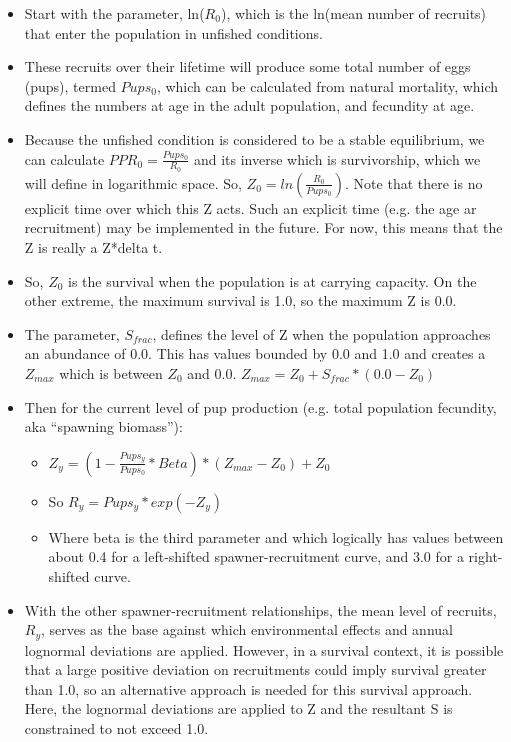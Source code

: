 	\begin{itemize}
		\item Start with the parameter, ln($R_0$), which is the ln(mean number of recruits) that enter the population in unfished conditions.
		\item These recruits over their lifetime will produce some total number of eggs (pups), termed $Pups_0$, which can be calculated from natural mortality, which defines the numbers at age in the adult population, and fecundity at age.
		\item Because the unfished condition is considered to be a stable equilibrium, we can calculate $PPR_0 = \frac{Pups_0}{R_0}$ and its inverse which is survivorship, which we will define in logarithmic space.  So, $Z_0 = ln(\frac{R_0}{Pups_0})$.  Note that there is no explicit time over which this Z acts.  Such an explicit time (e.g. the age ar recruitment) may be implemented in the future.  For now, this means that the Z is really a Z*delta t.
		\item So, $Z_0$ is the survival when the population is at carrying capacity.  On the other extreme, the maximum survival is 1.0, so the maximum Z is 0.0.
		\item The parameter, $S_{frac}$, defines the level of Z when the population approaches an abundance of 0.0.  This has values bounded by 0.0 and 1.0 and creates a $Z_{max}$ which is between $Z_0$ and 0.0. $Z_{max} = Z_0 + S_{frac}*(0.0-Z_0)$
		\item Then for the current level of pup production (e.g. total population fecundity, aka “spawning biomass”):
		\begin{itemize}
			\item $Z_y=(1 - \frac{Pups_y}{Pups_0}*Beta)*(Z_{max}-Z_0)+Z_0$
			\item So $R_y = Pups_y * exp(-Z_y)$
			\item Where beta is the third parameter and which logically has values between about 0.4 for a left-shifted spawner-recruitment curve, and 3.0 for a right-shifted curve.
		\end{itemize}
		\item With the other spawner-recruitment relationships, the mean level of recruits, $R_y$, serves as the base against which environmental effects and annual lognormal deviations are applied.  However, in a survival context, it is possible that a large positive deviation on recruitments could imply survival greater than 1.0, so an alternative approach is needed for this survival approach.  Here, the lognormal deviations are applied to Z and the resultant S is constrained to not exceed 1.0.

\end{itemize}
